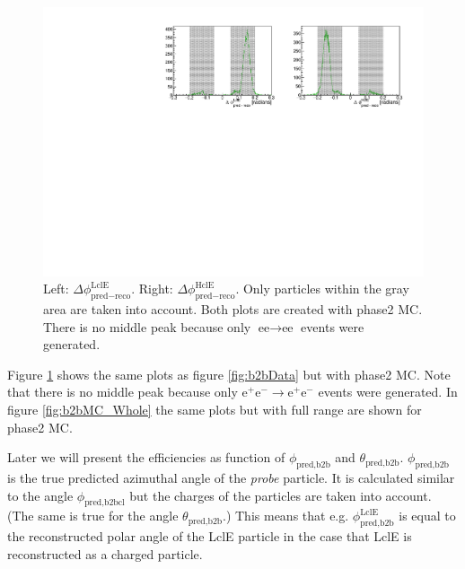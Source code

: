 \documentclass[a4paper,11pt,twosided,final,german,openbib,pdftex,listof=totoc,bibliography=totoc]{scrbook}
\begin{document}
\begin{figure}[h!]
	\centering
	\includegraphics[width=\textwidth]{Plots/master/sb2b_MC.pdf}
	\caption[b2bClusterPhi - clusterPhi For Phase2 MC]{Left: $\Delta \phi _{\textrm{pred} - \textrm{reco}}^{\textrm{LclE}}$. Right:  $\Delta \phi _{\textrm{pred} - \textrm{reco}}^{\textrm{HclE}}$. Only particles within the gray area are taken into account. Both plots are created with phase2 MC. There is no middle peak because only $\textrm{ee} \rightarrow \textrm{ee}$ events were generated.}
	\label{fig:b2bMC}
\end{figure}



Figure \ref{fig:b2bMC} shows the same plots as figure \ref{fig:b2bData} but with phase2 MC. Note that there is no middle peak because only $\textrm{e}^+ \textrm{e}^- \rightarrow \textrm{e}^+ \textrm{e}^-$ events were generated. In figure \ref{fig:b2bMC_Whole} the same plots but with full range are shown for phase2 MC.
\newline

Later we will present the efficiencies as function of $\phi_{\textrm{pred,b2b}}$ and $\theta_{\textrm{pred,b2b}}$.
$\phi_{\textrm{pred,b2b}}$ is the true predicted azimuthal angle of the \textit{probe} particle. It is calculated similar to the angle $\phi_{\textrm{pred,b2bcl}}$ but the charges of the particles are taken into account. (The same is true for the angle $\theta_{\textrm{pred,b2b}}$.) This means that e.g. $\phi_{\textrm{pred,b2b}}^{\textrm{LclE}}$ is equal to the reconstructed polar angle of the LclE particle in the case that LclE is reconstructed as a charged particle.
\end{document}
